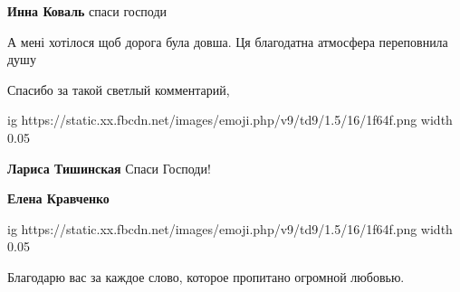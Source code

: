\begin{itemize}
\begin{itemize}
\textbf{Инна Коваль} спаси господи

 
А мені хотілося щоб дорога була довша. Ця благодатна атмосфера переповнила душу
\end{itemize}

 
Спасибо за такой светлый комментарий, 

\ifcmt
  ig https://static.xx.fbcdn.net/images/emoji.php/v9/td9/1.5/16/1f64f.png
  width 0.05
\fi

\begin{itemize}
 
\textbf{Лариса Тишинская} Спаси Господи!

 
\textbf{Елена Кравченко} 

\ifcmt
  ig https://static.xx.fbcdn.net/images/emoji.php/v9/td9/1.5/16/1f64f.png
  width 0.05
\fi

\end{itemize}

 
Благодарю вас за каждое слово, которое пропитано огромной любовью.

 

\end{itemize}
